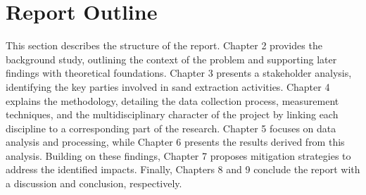 \section{Report Outline}
This section describes the structure of the report. Chapter 2 provides the background study, outlining the context of the problem and supporting later findings with theoretical foundations. Chapter 3 presents a stakeholder analysis, identifying the key parties involved in sand extraction activities. Chapter 4 explains the methodology, detailing the data collection process, measurement techniques, and the multidisciplinary character of the project by linking each discipline to a corresponding part of the research. Chapter 5 focuses on data analysis and processing, while Chapter 6 presents the results derived from this analysis. Building on these findings, Chapter 7 proposes mitigation strategies to address the identified impacts. Finally, Chapters 8 and 9 conclude the report with a discussion and conclusion, respectively.











